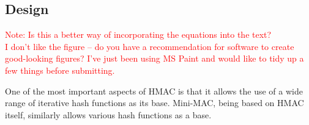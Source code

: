 	
\subsection{Design}


\textcolor{red}{Note: Is this a better way of incorporating the equations into the text?\\ I don't like the figure -- do you have a recommendation for software to create good-looking figures? I've just been using MS Paint and would like to tidy up a few things before submitting.}

One of the most important aspects of HMAC is that it allows the use of a wide range of iterative hash functions as its base. Mini-MAC, being based on HMAC itself, similarly allows various hash functions as a base.

